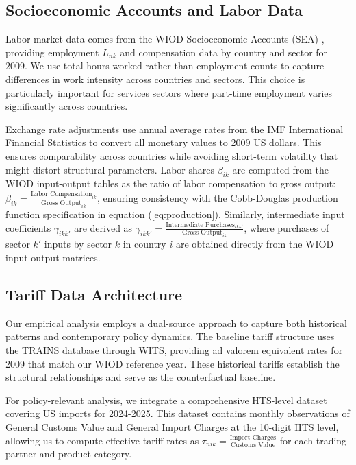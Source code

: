 \subsection{Socioeconomic Accounts and Labor Data}

Labor market data comes from the WIOD Socioeconomic Accounts (SEA) \citep{stehrer2014wiod}, providing employment $L_{nk}$ and compensation data by country and sector for 2009. We use total hours worked rather than employment counts to capture differences in work intensity across countries and sectors. This choice is particularly important for services sectors where part-time employment varies significantly across countries.

Exchange rate adjustments use annual average rates from the IMF International Financial Statistics to convert all monetary values to 2009 US dollars. This ensures comparability across countries while avoiding short-term volatility that might distort structural parameters. Labor shares $\beta_{ik}$ are computed from the WIOD input-output tables as the ratio of labor compensation to gross output: $\beta_{ik} = \frac{\text{Labor Compensation}_{ik}}{\text{Gross Output}_{ik}}$, ensuring consistency with the Cobb-Douglas production function specification in equation (\ref{eq:production}). Similarly, intermediate input coefficients $\gamma_{ikk'}$ are derived as $\gamma_{ikk'} = \frac{\text{Intermediate Purchases}_{ikk'}}{\text{Gross Output}_{ik}}$, where purchases of sector $k'$ inputs by sector $k$ in country $i$ are obtained directly from the WIOD input-output matrices.

\subsection{Tariff Data Architecture}

Our empirical analysis employs a dual-source approach to capture both historical patterns and contemporary policy dynamics. The baseline tariff structure uses the TRAINS database through WITS, providing ad valorem equivalent rates for 2009 that match our WIOD reference year. These historical tariffs establish the structural relationships and serve as the counterfactual baseline.

For policy-relevant analysis, we integrate a comprehensive HTS-level dataset covering US imports for 2024-2025. This dataset contains monthly observations of General Customs Value and General Import Charges at the 10-digit HTS level, allowing us to compute effective tariff rates as $\tau_{nik} = \frac{\text{Import Charges}}{\text{Customs Value}}$ for each trading partner and product category.

